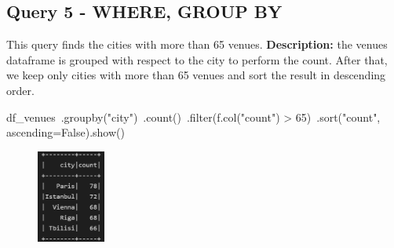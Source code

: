 \documentclass{Configuration_Files/PoliMi3i_thesis}
\begin{document}
\subsection{Query 5 - WHERE, GROUP BY}
This query finds the cities with more than 65 venues.\newline
\textbf{Description:} the venues dataframe is grouped with respect to the city to perform the count. After that, we keep only cities with
more than 65 venues and sort the result in descending order.\newline
\begin{python}
df_venues\
    .groupby("city")\
    .count()\
    .filter(f.col("count") > 65)\
    .sort("count", ascending=False).show()
\end{python}
\begin{figure}[H]
\centering
\includegraphics[width=0.2\textwidth]{query/spark_q5.PNG}
\label{fig:query5}
\end{figure}
\end{document}
